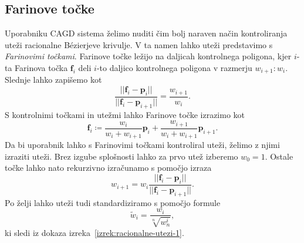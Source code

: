 \documentclass[isrm2, tisk]{fmfdelo}
\newcommand{\p}{\mathbf{p}}
\begin{document}
    \subsection{Farinove točke}
    Uporabniku CAGD sistema želimo nuditi čim bolj naraven način kontroliranja uteži racionalne Bézierjeve krivulje.
    V ta namen lahko uteži predstavimo s \textit{Farinovimi točkami}.
    Farinove točke ležijo na daljicah kontrolnega poligona, kjer $i$-ta Farinova točka $\mathbf{f}_i$ deli $i$-to daljico kontrolnega poligona v razmerju $w_{i+1}:w_{i}$.
    Slednje lahko zapišemo kot \[\frac{||\mathbf{f}_i-\p_i||}{||\mathbf{f}_i-\p_{i+1}||} = \frac{w_{i+1}}{w_{i}}.\]
    S kontrolnimi točkami in utežmi lahko Farinove točke izrazimo kot
    \[\mathbf{f}_i \coloneqq \frac{w_{i}}{w_{i}+w_{i+1}}\p_i +  \frac{w_{i+1}}{w_{i}+w_{i+1}}\p_{i+1}.\]
    Da bi uporabnik lahko s Farinovimi točkami kontroliral uteži, želimo z njimi izraziti uteži.
    Brez izgube splošnosti lahko za prvo utež izberemo $w_0=1$.
    Ostale točke lahko nato rekurzivno izračunamo s pomočjo izraza
    \[w_{i+1} = w_i\frac{||\mathbf{f}_i-\p_i||}{||\mathbf{f}_i-\p_{i+1}||}.\]
    Po želji lahko uteži tudi standardiziramo s pomočjo formule \[\tilde{w}_{i} = \frac{w_i}{\sqrt[n]{w_n^i}},\]
    ki sledi iz dokaza izreka~\ref{izrek:racionalne-utezi-1}.
\end{document}
